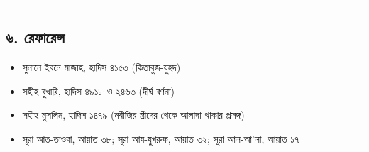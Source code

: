 \medskip\hrule\medskip

\subsection*{৬. রেফারেন্স}

\begin{itemize}
\item সুনানে ইবনে মাজাহ, হাদিস ৪১৫৩ (কিতাবুজ-যুহদ)
\item সহীহ বুখারি, হাদিস ৪৯১৮ ও ২৪৬৩ (দীর্ঘ বর্ণনা)
\item সহীহ মুসলিম, হাদিস ১৪৭৯ (নবীজির স্ত্রীদের থেকে আলাদা থাকার প্রসঙ্গ)
\item সূরা আত-তাওবা, আয়াত ৩৮; সূরা আয-যুখরুফ, আয়াত ৩২; সূরা আল-আ'লা, আয়াত ১৭
\end{itemize}


